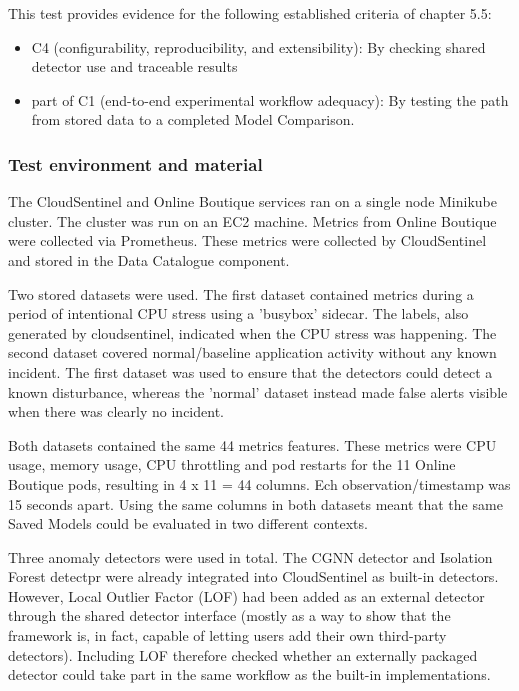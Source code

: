 This test provides evidence for the following established criteria of chapter 5.5:
\begin{itemize}
    \item C4 (configurability, reproducibility, and extensibility): By checking shared detector use and traceable results
    \item part of C1 (end-to-end experimental workflow adequacy): By testing the path from stored data to a completed Model Comparison.
\end{itemize}


\subsubsection{Test environment and material}

The CloudSentinel and Online Boutique services ran on a single node Minikube cluster. The cluster was run on an EC2 machine. Metrics from Online Boutique were collected via Prometheus. These metrics were collected by CloudSentinel and stored in the Data Catalogue component.

Two stored datasets were used. The first dataset contained metrics during a period of intentional CPU stress using a 'busybox' sidecar. The labels, also generated by cloudsentinel, indicated when the CPU stress was happening. The second dataset covered normal/baseline application activity without any known incident. The first dataset was used to ensure that the detectors could detect a known disturbance, whereas the 'normal' dataset instead made false alerts visible when there was clearly no incident.

Both datasets contained the same 44 metrics features. These metrics were CPU usage, memory usage, CPU throttling and pod restarts for the 11 Online Boutique pods,  resulting in 4 x 11 = 44 columns. Ech observation/timestamp was 15 seconds apart. Using the same columns in both datasets meant that the same Saved Models could be evaluated in two different contexts.

Three anomaly detectors were used in total. The CGNN detector and Isolation Forest detectpr were already integrated into CloudSentinel as built-in detectors. However,  Local Outlier Factor (LOF) had been added as an external detector through the shared detector interface (mostly as a way to show that the framework is, in fact, capable of letting users add their own third-party detectors). Including LOF therefore checked whether an externally packaged detector could take part in the same workflow as the built-in implementations.


